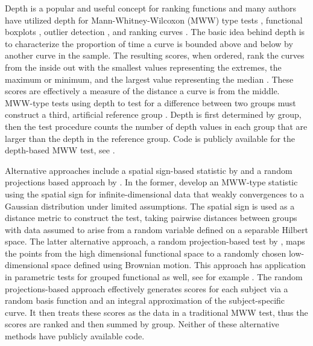 \documentclass[12pt]{article}
\theoremstyle{plain}
\begin{document}
	Depth is a popular and useful concept for ranking functions and many authors have utilized depth for Mann-Whitney-Wilcoxon (MWW) type tests \citep{Lopez2009,Lopez2010,Lopez2017}, functional boxplots \citep{Sun2011, Genton2014, Wrobel2016}, outlier detection \citep{SunGenton2012, Dai2018, Huang2019, Dai2020, AlemanGomez2022}, and ranking curves \citep{Lopez2009, Lopez2011, Sun2012, Sguera2021}. The basic idea behind depth is to characterize the proportion of time a curve is bounded above and below by another curve in the sample. The resulting scores, when ordered, rank the curves from the inside out with the smallest values representing the extremes, the maximum or minimum, and the largest value representing the median \citep{Lopez2009, Sun2012}. These scores are effectively a measure of the distance a curve is from the middle. MWW-type tests using depth to test for a difference between two groups must construct a third, artificial reference group  \citep{Lopez2009,Lopez2010,Lopez2017}. Depth is first determined by group, then the test procedure counts the number of depth values in each group that are larger than the depth in the reference group. Code is publicly available for the depth-based MWW test, see \cite{Lopez2017}.
	
	Alternative approaches include a spatial sign-based statistic by \cite{Chak2015} and a random projections based approach by \cite{Melendez2021}. In the former,  \cite{Chak2015} develop an MWW-type statistic using the spatial sign for infinite-dimensional data that weakly convergences to a Gaussian distribution under limited assumptions.  The spatial sign is used as a distance metric to construct the test, taking pairwise distances between groups with data assumed to arise from a random variable defined on a separable Hilbert space. The latter alternative approach, a random projection-based test by \cite{Melendez2021}, maps the points from the high dimensional functional space to a randomly chosen low-dimensional space defined using Brownian motion. This approach has application in parametric tests for grouped functional as well, see for example \cite{Cuesta2010}. The random projections-based approach effectively generates scores for each subject via a random basis function and an integral approximation of the subject-specific curve. It then treats these scores as the data in a traditional MWW test, thus the scores are ranked and then summed by group. Neither of these alternative methods have publicly available code.
	
\end{document}
